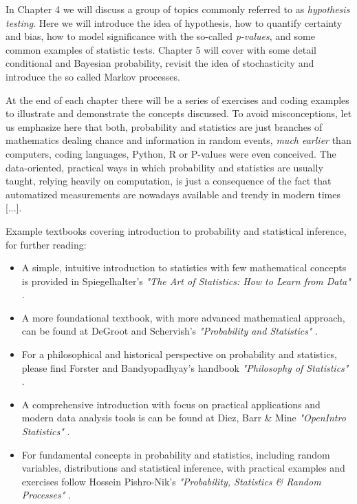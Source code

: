 \documentclass{book}
\begin{document}
In Chapter 4 we will discuss a group of topics commonly referred to as \textit{hypothesis testing}. Here we will introduce the idea of hypothesis, how to quantify certainty and bias, how to model significance with the so-called \textit{p-values}, and some common examples of statistic tests. Chapter 5 will cover with some detail conditional and Bayesian probability, revisit the idea of stochasticity and introduce the so called Markov processes.

\medskip

At the end of each chapter there will be a series of exercises and coding examples to illustrate and demonstrate the concepts discussed. To avoid misconceptions, let us emphasize here that both, probability and statistics are just branches of mathematics dealing chance and information in random events, \textit{much earlier} than computers, coding languages, Python, R or P-values were even conceived. The data-oriented, practical ways in which probability and statistics are usually taught, relying heavily on computation, is just a consequence of the fact that automatized measurements are nowadays available and trendy in modern times [...].

\medskip

Example textbooks covering introduction to probability and statistical inference, for further reading:

\begin{itemize}
\item A simple, intuitive introduction to statistics with few mathematical concepts is provided in Spiegelhalter's \textit{"The Art of Statistics: How to Learn from Data"} \cite{spiegelhalter2019art}. 
\item A more foundational textbook, with more advanced mathematical approach, can be found at DeGroot and Schervish's \textit{"Probability and Statistics"} \cite{degroot2012probability}.   
\item For a philosophical and historical perspective on probability and statistics, please find Forster and Bandyopadhyay's handbook \textit{"Philosophy of Statistics"} \cite{bandyopadhyay2011philosophy}.
\item A comprehensive introduction with focus on practical applications and modern data analysis tools is can be found at Diez, Barr \& Mine \textit{"OpenIntro Statistics"} \cite{openintro2025}.
\item For fundamental concepts in probability and statistics, including random variables, distributions and statistical inference, with practical examples and exercises follow Hossein Pishro-Nik's \textit{"Probability, Statistics \& Random Processes"} \cite{pishronik2014introduction}.
\end{itemize}
\end{document}
